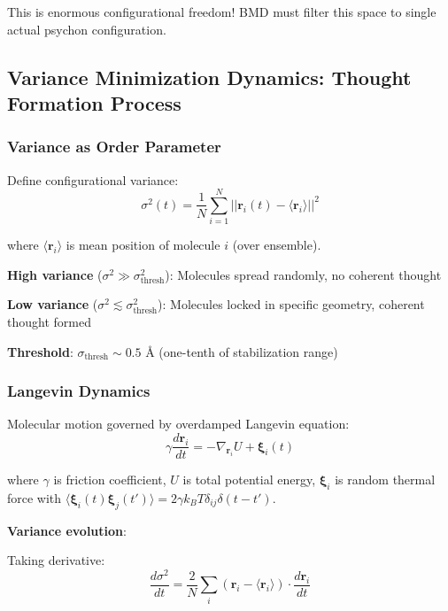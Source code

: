 \documentclass[11pt,onecolumn]{article}
\begin{document}
This is enormous configurational freedom! BMD must filter this space to single actual psychon configuration.

\subsection{Variance Minimization Dynamics: Thought Formation Process}

\subsubsection{Variance as Order Parameter}

Define configurational variance:
\begin{equation}
\sigma^2(t) = \frac{1}{N}\sum_{i=1}^{N} ||\mathbf{r}_i(t) - \langle\mathbf{r}_i\rangle||^2
\end{equation}

where $\langle\mathbf{r}_i\rangle$ is mean position of molecule $i$ (over ensemble).

\textbf{High variance} ($\sigma^2 \gg \sigma_{\text{thresh}}^2$): Molecules spread randomly, no coherent thought

\textbf{Low variance} ($\sigma^2 \lesssim \sigma_{\text{thresh}}^2$): Molecules locked in specific geometry, coherent thought formed

\textbf{Threshold}: $\sigma_{\text{thresh}} \sim 0.5$ Å (one-tenth of stabilization range)

\subsubsection{Langevin Dynamics}

Molecular motion governed by overdamped Langevin equation:
\begin{equation}
\gamma \frac{d\mathbf{r}_i}{dt} = -\nabla_{\mathbf{r}_i} U + \boldsymbol{\xi}_i(t)
\end{equation}

where $\gamma$ is friction coefficient, $U$ is total potential energy, $\boldsymbol{\xi}_i$ is random thermal force with $\langle\boldsymbol{\xi}_i(t)\boldsymbol{\xi}_j(t')\rangle = 2\gamma k_B T \delta_{ij}\delta(t-t')$.

\textbf{Variance evolution}:

Taking derivative:
\begin{equation}
\frac{d\sigma^2}{dt} = \frac{2}{N}\sum_i (\mathbf{r}_i - \langle\mathbf{r}_i\rangle) \cdot \frac{d\mathbf{r}_i}{dt}
\end{equation}
\end{document}
